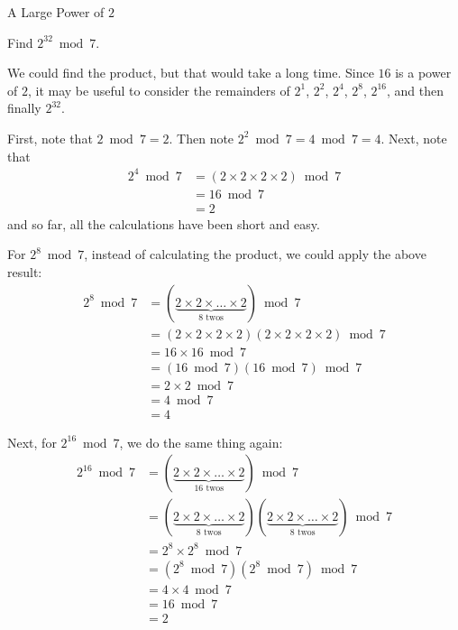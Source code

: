 \documentclass[a4paper,10pt]{report}
\begin{document}
\begin{problem}{A Large Power of \(2\)}

 Find \(2^{32} \bmod 7\).

 \begin{solution}

  We could find the product, but that would take a long time. Since \(16\) is a
  power of \(2\), it may be useful to consider the remainders of \(2^1\),
  \(2^2\), \(2^4\), \(2^8\), \(2^{16}\), and then finally \(2^{32}\).

  First, note that \(2 \bmod 7 = 2\). Then note \(2^2 \bmod 7 = 4 \bmod 7 =
  4\). Next, note that \begin{align*}
   2^4 \bmod 7
   &= (2 \times 2 \times 2 \times 2) \bmod 7 \\
   &= 16 \bmod 7 \\
   &= 2
  \end{align*} and so far, all the calculations have been short and easy.

  For \(2^8 \bmod 7\), instead of calculating the product, we could apply the
  above result: \begin{align*}
   2^8 \bmod 7
   &= (\underbrace{2 \times 2 \times \dots \times 2}_{8\text{ twos}}) \bmod 7 \\
   &= (2 \times 2 \times 2 \times 2)(2 \times 2 \times 2 \times 2) \bmod 7 \\
   &= 16\times16 \bmod 7 \\
   &= (16 \bmod 7)(16 \bmod 7) \bmod 7 \\
   &= 2 \times 2 \bmod 7 \\
   &= 4 \bmod 7 \\
   &= 4
  \end{align*}

  Next, for \(2^{16} \bmod 7\), we do the same thing again: \begin{align*}
   2^{16} \bmod 7
   &= (\underbrace{2 \times 2 \times \dots \times 2}_{16\text{ twos}}) \bmod 7 \\
   &= (\underbrace{2 \times 2 \times \dots \times 2}_{8\text{ twos}})
   (\underbrace{2 \times 2 \times \dots \times 2}_{8\text{ twos}}) \bmod 7 \\
   &= 2^8\times2^8 \bmod 7 \\
   &= (2^8 \bmod 7)(2^8 \bmod 7) \bmod 7 \\
   &= 4 \times 4 \bmod 7 \\
   &= 16 \bmod 7 \\
   &= 2
  \end{align*}


\end{solution}
\end{problem}
\end{document}
